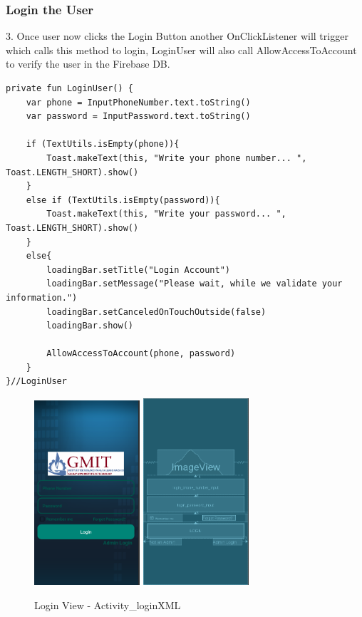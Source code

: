 \subsubsection{Login the User}
3. Once user now clicks the Login Button another OnClickListener will trigger which calls this method to login, LoginUser will also call AllowAccessToAccount to verify the user in the Firebase DB.
\begin{verbatim}
private fun LoginUser() {
    var phone = InputPhoneNumber.text.toString()
    var password = InputPassword.text.toString()

    if (TextUtils.isEmpty(phone)){
        Toast.makeText(this, "Write your phone number... ", Toast.LENGTH_SHORT).show()
    }
    else if (TextUtils.isEmpty(password)){
        Toast.makeText(this, "Write your password... ", Toast.LENGTH_SHORT).show()
    }
    else{
        loadingBar.setTitle("Login Account")
        loadingBar.setMessage("Please wait, while we validate your information.")
        loadingBar.setCanceledOnTouchOutside(false)
        loadingBar.show()
        
        AllowAccessToAccount(phone, password)
    }
}//LoginUser
\end{verbatim}
\begin{figure}[h!]
	\caption{Login View - Activity\_login\.XML}
	\label{image:myImageName}
	\centering
	\includegraphics[width=0.35\textwidth]{Images/login_view.png}
	\includegraphics[width=0.35\textwidth]{Images/login_deisign.png}
\end{figure}
\newpage

